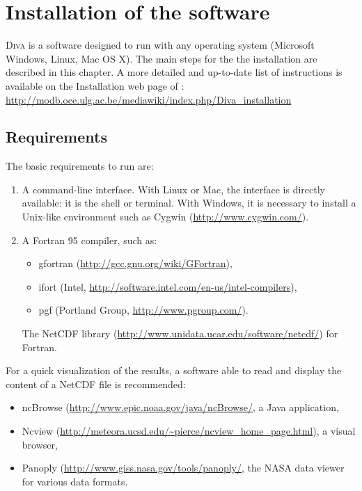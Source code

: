 \chapter{Installation of the software}

\lettrine[lines=2]{D}{iva} is a software designed to run with any operating system (Microsoft Windows, Linux, Mac OS X). The main steps for the the installation are described in this chapter. A more detailed and up-to-date list of instructions is available on the Installation web page of \diva: \url{http://modb.oce.ulg.ac.be/mediawiki/index.php/Diva_installation}


\minitoc

\newpage

\section{Requirements}

The basic requirements to run \diva are:
\begin{enumerate}
\item A command-line interface. With Linux or Mac, the interface is directly available: it is the shell or terminal. With Windows, it is necessary to install a Unix-like environment such as Cygwin (\url{http://www.cygwin.com/}).
\item A Fortran 95 compiler, such as:
\begin{itemize}
\item gfortran (\url{http://gcc.gnu.org/wiki/GFortran}),
\item ifort (Intel\textsuperscript{\textregistered}, \url{http://software.intel.com/en-us/intel-compilers}),
\item pgf (Portland Group, \url{http://www.pgroup.com/}).
\end{itemize}    
\itzm The NetCDF library (\url{http://www.unidata.ucar.edu/software/netcdf/}) for Fortran.
\end{enumerate}

For a quick visualization of the results, a software able to read and display the content of a NetCDF file is recommended:
\begin{itemize}
\item ncBrowse (\url{http://www.epic.noaa.gov/java/ncBrowse/}, a Java application,
\item Ncview (\url{http://meteora.ucsd.edu/~pierce/ncview_home_page.html}), a visual browser, 
\item Panoply (\url{http://www.giss.nasa.gov/tools/panoply/}, the NASA data viewer for various data formats.
\end{itemize}


